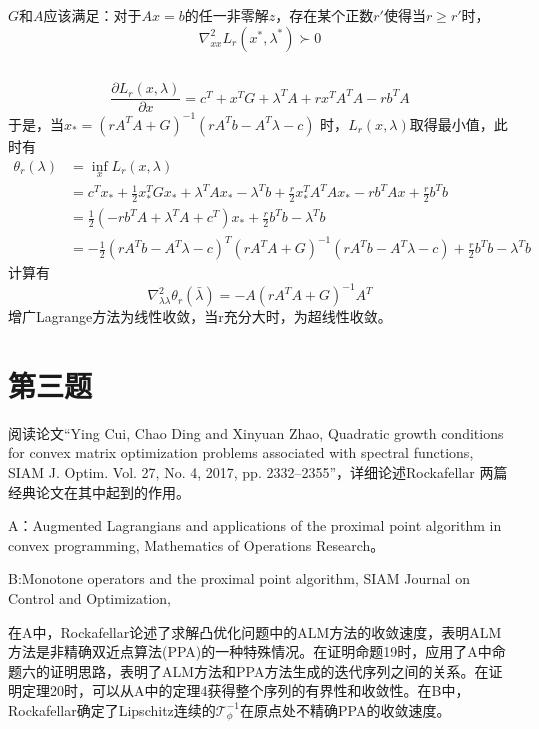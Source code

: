 \documentclass[fontset=mac]{ctexart}
\begin{document}
	\subsection{}
	$G$和$A$应该满足：对于$Ax=b$的任一非零解$z$，存在某个正数$r'$使得当$r \ge r'$时，
	$$
	\nabla_{x x}^{2} L_{r}\left(x^{*}, \lambda^{*}\right) \succ 0
	$$
	\subsection{}
	$$
	\frac{\partial L_r(x,\lambda)}{\partial x} = c^T + x^T G + \lambda^TA + r x^TA^TA - r b^TA
	$$
	于是，当$x_* = (r A^TA + G)^{-1}(r A^Tb - A^T \lambda - c)$ 时，$L_r(x,\lambda)$取得最小值，此时有
	$$
	\begin{aligned}
		\theta_r({\lambda}) &= \inf _{x} L_{r}(x, \lambda)  \\
		&= c^Tx_* + \frac{1}{2}x_*^TGx_* + \lambda ^T Ax_* - \lambda^T b + \frac{r}{2}x_*^TA^TAx_* -r b^TAx + \frac{r}{2}b^Tb \\
		&= \frac{1}{2} (-r b^TA + \lambda^T A + c^T)x_* + \frac{r}{2}b^T b - \lambda^T b\\
		&= -\frac{1}{2} (rA^Tb - A^T \lambda - c)^T(r A^TA + G)^{-1}(rA^Tb - A^T \lambda - c) + \frac{r}{2}b^Tb - \lambda^T b
	\end{aligned}
	$$
	计算有
	$$
	\nabla_{\lambda \lambda}^{2} \theta_{r}(\bar{\lambda}) = -A(rA^TA+G)^{-1}A^T
	$$
	增广Lagrange方法为线性收敛，当r充分大时，为超线性收敛。
	
	\newpage
	\section{第三题}
	阅读论文“Ying Cui, Chao Ding and Xinyuan Zhao, Quadratic growth conditions for convex matrix optimization problems associated with spectral functions, SIAM J. Optim. Vol. 27, No. 4, 2017, pp. 2332–2355”，详细论述Rockafellar 两篇经典论文在其中起到的作用。
	
	A：Augmented Lagrangians and applications of the proximal point algorithm
	in convex programming, Mathematics of Operations Research。
	
	B:Monotone operators and the proximal point algorithm, SIAM Journal
	on Control and Optimization,
	
	在A中，Rockafellar论述了求解凸优化问题中的ALM方法的收敛速度，表明ALM方法是非精确双近点算法(PPA)的一种特殊情况。在证明命题19时，应用了A中命题六的证明思路，表明了ALM方法和PPA方法生成的迭代序列之间的关系。在证明定理20时，可以从A中的定理4获得整个序列的有界性和收敛性。在B中，Rockafellar确定了Lipschitz连续的$\mathcal{T}_{\phi}^{-1}$在原点处不精确PPA的收敛速度。
\end{document}
